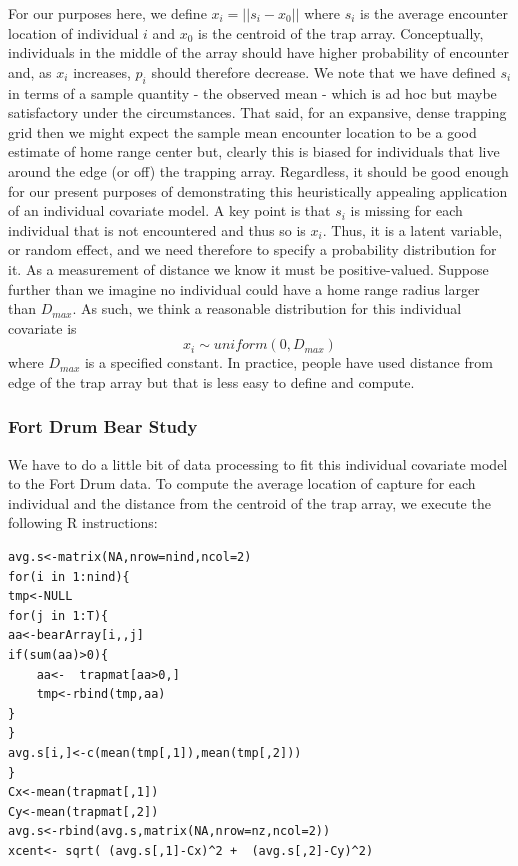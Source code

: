 For our purposes here, we define $x_{i} = ||s_{i} - x_{0}||$ where $s_{i}$
is the average encounter location of individual $i$ and $x_{0}$ is the
centroid of the trap array.  Conceptually, individuals in the middle
of the array should have higher probability of encounter and, as
$x_{i}$ increases, $p_{i}$ should therefore decrease. We note that we
have defined $s_{i}$ in terms of a sample quantity - the observed mean
- which is ad hoc but maybe satisfactory under the circumstances. That
said, for
an expansive, dense trapping grid then we might expect the sample mean
encounter location to be a good estimate of home range center but,
clearly this is biased for individuals that live around the edge (or
off) the trapping array. Regardless, it should be good enough for our
present purposes of demonstrating this heuristically appealing
application of an individual covariate model. A key point is that
$s_{i}$ is missing for each individual that is not encountered and
thus so is $x_{i}$. Thus,
it is a latent variable, or random effect, and we need therefore to
specify a probability distribution for it.
As a measurement of distance we know it must be
positive-valued. Suppose further than we imagine no individual could
have a home range radius larger than $D_{max}$. As such, we think a
reasonable distribution for this individual covariate is
\[
 x_{i} \sim uniform(0,D_{max})
\]
where $D_{max}$ is a specified constant.  In practice, people have
used distance from edge of the trap array but that is less easy to
define and compute.


\subsubsection{Fort Drum Bear Study}

We have to do a little bit of data processing to fit this individual
covariate model to the Fort Drum data. To compute the average location
of capture for each individual and the distance from the centroid of
the trap array, we execute the following R instructions:

\begin{verbatim}
avg.s<-matrix(NA,nrow=nind,ncol=2)
for(i in 1:nind){
tmp<-NULL
for(j in 1:T){
aa<-bearArray[i,,j]
if(sum(aa)>0){
 	aa<-  trapmat[aa>0,]
 	tmp<-rbind(tmp,aa)
}
}
avg.s[i,]<-c(mean(tmp[,1]),mean(tmp[,2]))
}
Cx<-mean(trapmat[,1])
Cy<-mean(trapmat[,2])
avg.s<-rbind(avg.s,matrix(NA,nrow=nz,ncol=2))
xcent<- sqrt( (avg.s[,1]-Cx)^2 +  (avg.s[,2]-Cy)^2)
\end{verbatim}

